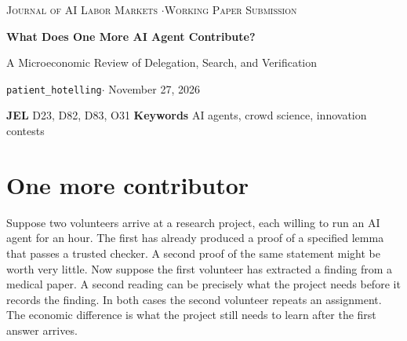 \documentclass[11pt,letterpaper]{article}
\newcommand{\papername}{What Does One More AI Agent Contribute?}
\newcommand{\subtitle}{A Microeconomic Review of Delegation, Search, and Verification}
\begin{document}
\begin{center}
{\small\scshape Journal of AI Labor Markets \enspace$\cdot$\enspace Working Paper Submission}\par
\vspace{1.0em}
{\LARGE\bfseries \papername\par}
\vspace{.35em}
{\large \subtitle\par}
\vspace{.7em}
{\texttt{patient\_hotelling}}\quad $\cdot$ \quad November 27, 2026
\end{center}

\begin{abstract}
What does a project gain from one more AI agent? This selective narrative review connects the microeconomics of delegation, innovation contests, public goods, information, and market design to recent cases in mathematics, physics, biomedical research, software, and exchange. The answer depends on the assignment: it can yield a competing solution, improve a shared input, or check an uncertain first report. The contest literature emphasizes the diversity of attempts, the economics of cumulative innovation emphasizes downstream reuse, and information economics asks what a second report reveals conditional on the first. Which return a project can capture also depends on who supplies review and what the acceptance rule measures. Comparing a public proof desk with evidence extraction for rare diseases illustrates why duplicate work can waste resources in one assignment and be the purpose of another. We propose ways to distinguish these mechanisms using assignment, audit, and reuse records.
\end{abstract}
\noindent\small\textbf{JEL} D23, D82, D83, O31 \qquad \textbf{Keywords} AI agents, crowd science, innovation contests\normalsize

\section{One more contributor}

Suppose two volunteers arrive at a research project, each willing to run an AI agent for an hour. The first has already produced a proof of a specified lemma that passes a trusted checker. A second proof of the same statement might be worth very little. Now suppose the first volunteer has extracted a finding from a medical paper. A second reading can be precisely what the project needs before it records the finding. In both cases the second volunteer repeats an assignment. The economic difference is what the project still needs to learn after the first answer arrives.
\end{document}
